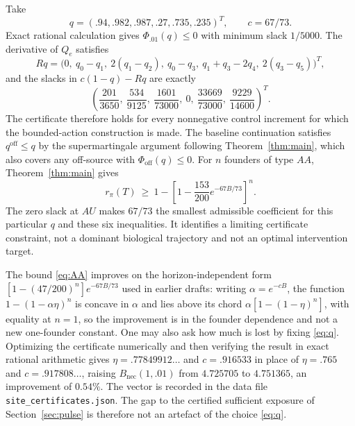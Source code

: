 Take
\begin{equation}\label{eq:q}
 q=(.94,.982,.987,.27,.735,.235)^T,\qquad c=67/73 .
\end{equation}
Exact rational calculation gives $\Phi_{.01}(q)\le0$ with minimum slack
$1/5000$. The derivative of $Q_e$ satisfies
\[
 Rq=\bigl(0,\ q_0-q_1,\ 2(q_1-q_2),\ q_0-q_3,\ q_1+q_3-2q_4,\
      2(q_3-q_5)\bigr)^T,
\]
and the slacks in $c(1-q)-Rq$ are exactly
\begin{equation}\label{eq:slacks}
 \left(\frac{201}{3650},\ \frac{534}{9125},\ \frac{1601}{73000},\ 0,\
       \frac{33669}{73000},\ \frac{9229}{14600}\right)^{\!T}.
\end{equation}
The certificate therefore holds for every nonnegative control increment for
which the bounded-action construction is made. The baseline continuation
satisfies $q^{\mathrm{off}}\le q$ by the supermartingale argument following
Theorem~\ref{thm:main}, which also covers any off-source with
$\Phi_{\mathrm{off}}(q)\le0$. For $n$ founders of type $AA$,
Theorem~\ref{thm:main} gives
\begin{equation}\label{eq:AA}
 r_\pi(T)\ \ge\ 1-\left[1-\frac{153}{200}e^{-67B/73}\right]^n .
\end{equation}
The zero slack at $AU$ makes $67/73$ the smallest admissible coefficient for
this particular $q$ and these six inequalities. It identifies a limiting
certificate constraint, not a dominant biological trajectory and not an optimal
intervention target.

\begin{remark}
\label{rem:optcert}
The bound \eqref{eq:AA} improves on the horizon-independent form
$[1-(47/200)^n]e^{-67B/73}$ used in earlier drafts: writing $\alpha=e^{-cB}$,
the function $1-(1-\alpha\eta)^n$ is concave in $\alpha$ and lies above its
chord $\alpha[1-(1-\eta)^n]$, with equality at $n=1$, so the improvement is in
the founder dependence and not a new one-founder constant. One may also ask how
much is lost by fixing \eqref{eq:q}. Optimizing the certificate numerically and
then verifying the result in exact rational arithmetic gives
$\eta=.77849912\ldots$ and $c=.916533$ in place of $\eta=.765$ and
$c=.917808\ldots$, raising $B_{\mathrm{nec}}(1,.01)$ from $4.725705$ to
$4.751365$, an improvement of $0.54\%$. The vector is recorded in
the data file \texttt{site\_certificates.json}. The gap to the certified sufficient
exposure of Section~\ref{sec:pulse} is therefore not an artefact of the choice
\eqref{eq:q}.
\end{remark}

